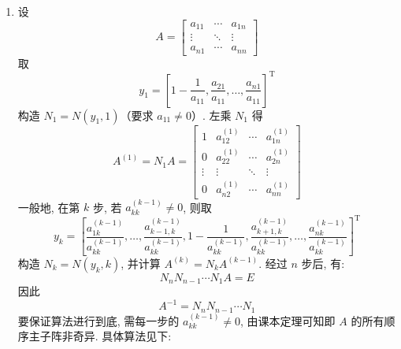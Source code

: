 \documentclass[12pt, answers]{exam}     %
\newcommand{\T}{\mathrm{T}}
\begin{document}
\begin{questions}
\begin{solution}
\begin{enumerate}[label=(\arabic*)]
    \item 设
    \[
    A = 
    \begin{bmatrix}
    a_{11} & \cdots & a_{1n} \\
    \vdots & \ddots & \vdots \\
    a_{n1} & \cdots & a_{nn}
    \end{bmatrix}
    \]
    取
    \[
    y_1 = \left[ 1 - \frac{1}{a_{11}}, \frac{a_{21}}{a_{11}}, \ldots, \frac{a_{n1}}{a_{11}} \right]^{\T}
    \]
    构造 \( N_1 = N(y_1, 1) \)（要求 \( a_{11} \neq 0 \)）. 左乘 \( N_1 \) 得
    \[
    A^{(1)} = N_1 A = 
    \begin{bmatrix}
    1 & a_{12}^{(1)} & \cdots & a_{1n}^{(1)} \\
    0 & a_{22}^{(1)} & \cdots & a_{2n}^{(1)} \\
    \vdots & \vdots & \ddots & \vdots \\
    0 & a_{n2}^{(1)} & \cdots & a_{nn}^{(1)}
    \end{bmatrix}
    \]
    一般地, 在第 \( k \) 步, 若 \( a_{kk}^{(k-1)} \neq 0 \), 则取
    \[
    y_k = \left[ \frac{a_{1k}^{(k-1)}}{a_{kk}^{(k-1)}}, \ldots, \frac{a_{k-1,k}^{(k-1)}}{a_{kk}^{(k-1)}}, 1 - \frac{1}{a_{kk}^{(k-1)}}, \frac{a_{k+1,k}^{(k-1)}}{a_{kk}^{(k-1)}}, \ldots, \frac{a_{nk}^{(k-1)}}{a_{kk}^{(k-1)}} \right]^{\T}
    \]
    构造 \( N_k = N(y_k, k) \), 并计算 \( A^{(k)} = N_k A^{(k-1)} \). 经过 \( n \) 步后, 有: 
    \[
    N_n N_{n-1} \cdots N_1 A = E
    \]
    因此
    \[
    A^{-1} = N_n N_{n-1} \cdots N_1
    \]
    要保证算法进行到底, 需每一步的 \( a_{kk}^{(k-1)} \neq 0 \), 由课本定理可知即 \( A \) 的所有顺序主子阵非奇异. 具体算法见下:
\end{enumerate}
\begin{algorithm}[H]
\end{algorithm}
\end{solution}
\end{questions}
\end{document}
